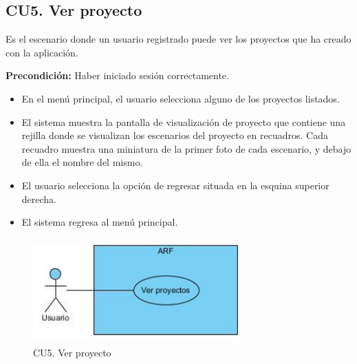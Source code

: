 \newpage
\subsection{CU5. Ver proyecto}\par
Es el escenario donde un usuario registrado puede ver los proyectos que ha creado con la aplicación.\par
\textbf{Precondición:} Haber iniciado sesión correctamente.\par
\begin{itemize}
	\item En el menú principal, el usuario selecciona alguno de los proyectos listados.
	\item El sistema muestra la pantalla de visualización de proyecto que contiene una rejilla donde se visualizan los escenarios del proyecto en recuadros. Cada recuadro muestra una miniatura de la primer foto de cada escenario, y debajo de ella el nombre del mismo.
	\item El usuario selecciona la opción de regresar situada en la esquina superior derecha.
	\item El sistema regresa al menú principal.
\end{itemize}

\begin{figure}[!htbp]
	\centering
	\includegraphics[width=8cm,height=4cm]{imagenes/analisis/cu/ver_proyectos.jpg}
	\caption{CU5. Ver proyecto}
	\label{fig:verproyecto}
\end{figure} 

